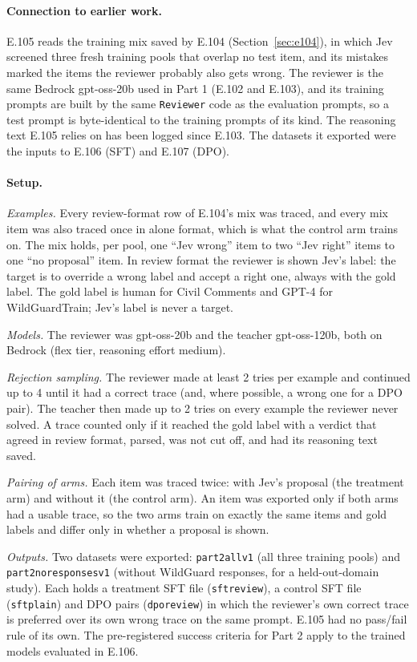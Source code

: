 \documentclass[11pt]{article}
\renewcommand{\_}{\origunderscore\allowbreak}
\begin{document}
\paragraph{Connection to earlier work.}
E.105 reads the training mix saved by E.104 (Section~\ref{sec:e104}), in which Jev screened three fresh training pools that overlap no test item, and its mistakes marked the items the reviewer probably also gets wrong. The reviewer is the same Bedrock gpt-oss-20b used in Part 1 (E.102 and E.103), and its training prompts are built by the same \texttt{Reviewer} code as the evaluation prompts, so a test prompt is byte-identical to the training prompts of its kind. The reasoning text E.105 relies on has been logged since E.103. The datasets it exported were the inputs to E.106 (SFT) and E.107 (DPO).

\paragraph{Setup.}
\emph{Examples.} Every review-format row of E.104's mix was traced, and every mix item was also traced once in alone format, which is what the control arm trains on. The mix holds, per pool, one ``Jev wrong'' item to two ``Jev right'' items to one ``no proposal'' item. In review format the reviewer is shown Jev's label: the target is to override a wrong label and accept a right one, always with the gold label. The gold label is human for Civil Comments and GPT-4 for WildGuardTrain; Jev's label is never a target.

\emph{Models.} The reviewer was gpt-oss-20b and the teacher gpt-oss-120b, both on Bedrock (flex tier, reasoning effort medium).

\emph{Rejection sampling.} The reviewer made at least 2 tries per example and continued up to 4 until it had a correct trace (and, where possible, a wrong one for a DPO pair). The teacher then made up to 2 tries on every example the reviewer never solved. A trace counted only if it reached the gold label with a verdict that agreed in review format, parsed, was not cut off, and had its reasoning text saved.

\emph{Pairing of arms.} Each item was traced twice: with Jev's proposal (the treatment arm) and without it (the control arm). An item was exported only if both arms had a usable trace, so the two arms train on exactly the same items and gold labels and differ only in whether a proposal is shown.

\emph{Outputs.} Two datasets were exported: \texttt{part2\_all\_v1} (all three training pools) and \texttt{part2\_no\_responses\_v1} (without WildGuard responses, for a held-out-domain study). Each holds a treatment SFT file (\texttt{sft\_review}), a control SFT file (\texttt{sft\_plain}) and DPO pairs (\texttt{dpo\_review}) in which the reviewer's own correct trace is preferred over its own wrong trace on the same prompt. E.105 had no pass/fail rule of its own. The pre-registered success criteria for Part 2 apply to the trained models evaluated in E.106.
\end{document}
